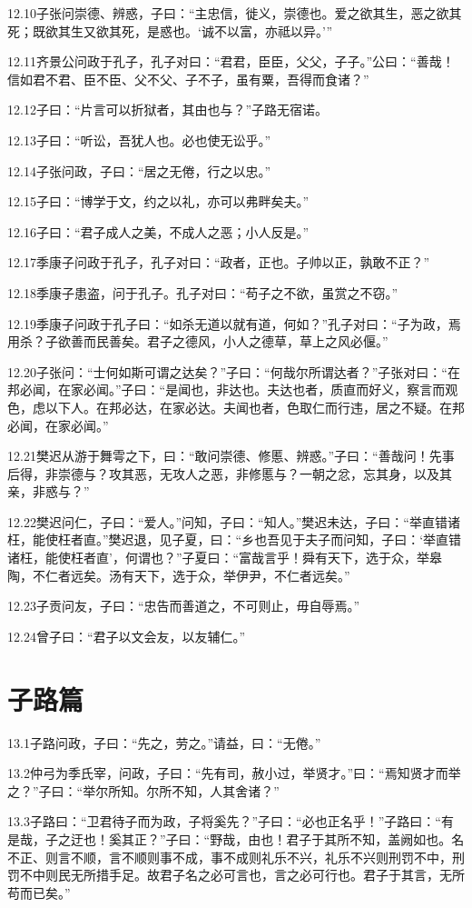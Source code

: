 \documentclass[a4paper,12pt,UTF8,twoside]{ctexbook}
\begin{document}
12.10子张问崇德、辨惑，子曰：“主忠信，徙义，崇德也。爱之欲其生，恶之欲其死；既欲其生又欲其死，是惑也。‘诚不以富，亦祗以异。’”

12.11齐景公问政于孔子，孔子对曰：“君君，臣臣，父父，子子。”公曰：“善哉！信如君不君、臣不臣、父不父、子不子，虽有粟，吾得而食诸？”

12.12子曰：“片言可以折狱者，其由也与？”子路无宿诺。

12.13子曰：“听讼，吾犹人也。必也使无讼乎。”

12.14子张问政，子曰：“居之无倦，行之以忠。”

12.15子曰：“博学于文，约之以礼，亦可以弗畔矣夫。”

12.16子曰：“君子成人之美，不成人之恶；小人反是。”

12.17季康子问政于孔子，孔子对曰：“政者，正也。子帅以正，孰敢不正？”

12.18季康子患盗，问于孔子。孔子对曰：“苟子之不欲，虽赏之不窃。”

12.19季康子问政于孔子曰：“如杀无道以就有道，何如？”孔子对曰：“子为政，焉用杀？子欲善而民善矣。君子之德风，小人之德草，草上之风必偃。”

12.20子张问：“士何如斯可谓之达矣？”子曰：“何哉尔所谓达者？”子张对曰：“在邦必闻，在家必闻。”子曰：“是闻也，非达也。夫达也者，质直而好义，察言而观色，虑以下人。在邦必达，在家必达。夫闻也者，色取仁而行违，居之不疑。在邦必闻，在家必闻。”

12.21樊迟从游于舞雩之下，曰：“敢问崇德、修慝、辨惑。”子曰：“善哉问！先事后得，非崇德与？攻其恶，无攻人之恶，非修慝与？一朝之忿，忘其身，以及其亲，非惑与？”

12.22樊迟问仁，子曰：“爱人。”问知，子曰：“知人。”樊迟未达，子曰：“举直错诸枉，能使枉者直。”樊迟退，见子夏，曰：“乡也吾见于夫子而问知，子曰：‘举直错诸枉，能使枉者直’，何谓也？”子夏曰：“富哉言乎！舜有天下，选于众，举皋陶，不仁者远矣。汤有天下，选于众，举伊尹，不仁者远矣。”

12.23子贡问友，子曰：“忠告而善道之，不可则止，毋自辱焉。”

12.24曾子曰：“君子以文会友，以友辅仁。”

\chapter{子路篇}
13.1子路问政，子曰：“先之，劳之。”请益，曰：“无倦。”

13.2仲弓为季氏宰，问政，子曰：“先有司，赦小过，举贤才。”曰：“焉知贤才而举之？”子曰：“举尔所知。尔所不知，人其舍诸？”

13.3子路曰：“卫君待子而为政，子将奚先？”子曰：“必也正名乎！”子路曰：“有是哉，子之迂也！奚其正？”子曰：“野哉，由也！君子于其所不知，盖阙如也。名不正、则言不顺，言不顺则事不成，事不成则礼乐不兴，礼乐不兴则刑罚不中，刑罚不中则民无所措手足。故君子名之必可言也，言之必可行也。君子于其言，无所苟而已矣。”
\end{document}
